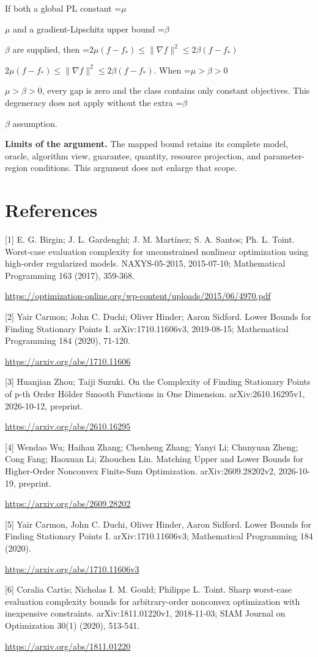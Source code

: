 \documentclass[10pt,a4paper]{article}
\newcommand{\AtlasMath}[1]{\par\begingroup\centering\setbox0=\hbox{$\displaystyle #1$}\ifdim\wd0>1.4\linewidth\typeout{ATLAS WIDE FORMULA: \the\wd0}\fi\ifdim\wd0>\linewidth\resizebox{\linewidth}{!}{\box0}\else\box0\fi\par\endgroup}
\newcommand{\AtlasInlineMath}[1]{\begingroup\setbox0=\hbox{$#1$}\ifdim\wd0>.4\linewidth\endgroup\AtlasMath{#1}\else\endgroup$#1$\fi}
\begin{document}
If both a global PL constant \AtlasInlineMath{\mu} and a gradient-Lipschitz upper bound \AtlasInlineMath{\beta} are supplied, then \AtlasInlineMath{2\mu(f-f_*)\le\|\nabla f\|^2\le2\beta(f-f_*)}. When \AtlasInlineMath{\mu>\beta>0}, every gap is zero and the class contains only constant objectives. This degeneracy does not apply without the extra \AtlasInlineMath{\beta} assumption.

\textbf{Limits of the argument.} The mapped bound retains its complete model, oracle, algorithm view, guarantee, quantity, resource projection, and parameter-region conditions. This argument does not enlarge that scope.

\section{References}
[1] E. G. Birgin; J. L. Gardenghi; J. M. Martínez; S. A. Santos; Ph. L. Toint. Worst-case evaluation complexity for unconstrained nonlinear optimization using high-order regularized models. NAXYS-05-2015, 2015-07-10; Mathematical Programming 163 (2017), 359-368.

\url{https://optimization-online.org/wp-content/uploads/2015/06/4970.pdf}

[2] Yair Carmon; John C. Duchi; Oliver Hinder; Aaron Sidford. Lower Bounds for Finding Stationary Points I. arXiv:1710.11606v3, 2019-08-15; Mathematical Programming 184 (2020), 71-120.

\url{https://arxiv.org/abs/1710.11606}

[3] Huanjian Zhou; Taiji Suzuki. On the Complexity of Finding Stationary Points of p-th Order Hölder Smooth Functions in One Dimension. arXiv:2610.16295v1, 2026-10-12, preprint.

\url{https://arxiv.org/abs/2610.16295}

[4] Wendao Wu; Haihan Zhang; Chenheng Zhang; Yanyi Li; Chunyuan Zheng; Cong Fang; Haoxuan Li; Zhouchen Lin. Matching Upper and Lower Bounds for Higher-Order Nonconvex Finite-Sum Optimization. arXiv:2609.28202v2, 2026-10-19, preprint.

\url{https://arxiv.org/abs/2609.28202}

[5] Yair Carmon, John C. Duchi, Oliver Hinder, Aaron Sidford. Lower Bounds for Finding Stationary Points I. arXiv:1710.11606v3; Mathematical Programming 184 (2020).

\url{https://arxiv.org/abs/1710.11606v3}

[6] Coralia Cartis; Nicholas I. M. Gould; Philippe L. Toint. Sharp worst-case evaluation complexity bounds for arbitrary-order nonconvex optimization with inexpensive constraints. arXiv:1811.01220v1, 2018-11-03; SIAM Journal on Optimization 30(1) (2020), 513-541.

\url{https://arxiv.org/abs/1811.01220}
\end{document}
